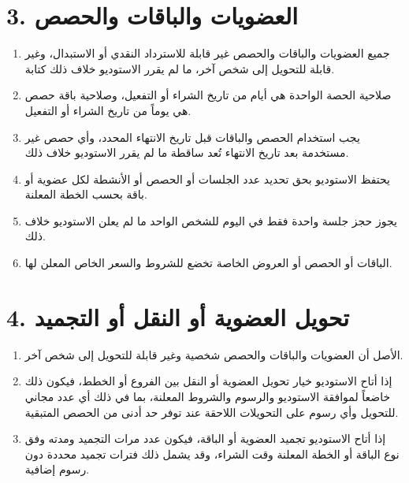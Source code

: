 \documentclass[12pt,a4paper]{article}
\newcommand{\engnum}[1]{\textLR{#1}}
\begin{document}
\section*{3. العضويات والباقات والحصص}
\begin{enumerate}
    \item جميع العضويات والباقات والحصص غير قابلة للاسترداد النقدي أو الاستبدال، وغير قابلة للتحويل إلى شخص آخر، ما لم يقرر الاستوديو خلاف ذلك كتابة.
    \item صلاحية الحصة الواحدة هي \engnum{7} أيام من تاريخ الشراء أو التفعيل، وصلاحية باقة \engnum{10} حصص هي \engnum{30} يوماً من تاريخ الشراء أو التفعيل.
    \item يجب استخدام الحصص والباقات قبل تاريخ الانتهاء المحدد، وأي حصص غير مستخدمة بعد تاريخ الانتهاء تُعد ساقطة ما لم يقرر الاستوديو خلاف ذلك.
    \item يحتفظ الاستوديو بحق تحديد عدد الجلسات أو الحصص أو الأنشطة لكل عضوية أو باقة بحسب الخطة المعلنة.
    \item يجوز حجز جلسة واحدة فقط في اليوم للشخص الواحد ما لم يعلن الاستوديو خلاف ذلك.
    \item الباقات أو الحصص أو العروض الخاصة تخضع للشروط والسعر الخاص المعلن لها.
\end{enumerate}

\section*{4. تحويل العضوية أو النقل أو التجميد}
\begin{enumerate}
    \item الأصل أن العضويات والباقات والحصص شخصية وغير قابلة للتحويل إلى شخص آخر.
    \item إذا أتاح الاستوديو خيار تحويل العضوية أو النقل بين الفروع أو الخطط، فيكون ذلك خاضعاً لموافقة الاستوديو والرسوم والشروط المعلنة، بما في ذلك أي عدد مجاني للتحويل وأي رسوم على التحويلات اللاحقة عند توفر حد أدنى من الحصص المتبقية.
    \item إذا أتاح الاستوديو تجميد العضوية أو الباقة، فيكون عدد مرات التجميد ومدته وفق نوع الباقة أو الخطة المعلنة وقت الشراء، وقد يشمل ذلك فترات تجميد محددة دون رسوم إضافية.
\end{enumerate}
\end{document}
